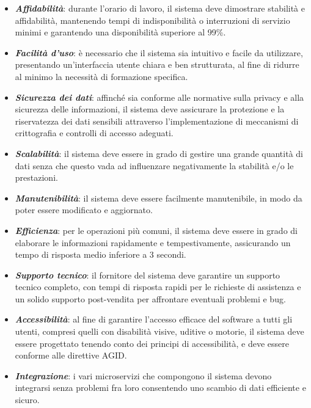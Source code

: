 \documentclass{article}
\begin{document}
  \begin{itemize}
    \item \textbf{\emph{Affidabilità}}: durante l'orario di lavoro, il sistema deve dimostrare 
        stabilità e affidabilità, mantenendo tempi di indisponibilità o 
        interruzioni di servizio minimi e garantendo una disponibilità superiore al 99\%.
    \item \textbf{\emph{Facilità d'uso}}: è necessario che il sistema sia intuitivo e facile 
        da utilizzare, presentando un'interfaccia utente chiara e ben strutturata, 
        al fine di ridurre al minimo la necessità di formazione specifica.
    \item \textbf{\emph{Sicurezza dei dati}}: affinché sia conforme alle normative sulla privacy 
        e alla sicurezza delle informazioni, il sistema deve assicurare la protezione e 
        la riservatezza dei dati sensibili attraverso l'implementazione di meccanismi di 
        crittografia e controlli di accesso adeguati.
    \item \textbf{\emph{Scalabilità}}: il sistema deve essere in grado di gestire una grande quantità
        di dati senza che questo vada ad influenzare negativamente la stabilità e/o le prestazioni.
    \item \textbf{\emph{Manutenibilità}}: il sistema deve essere facilmente manutenibile, 
        in modo da poter essere modificato e aggiornato.
    \item \textbf{\emph{Efficienza}}: per le operazioni più comuni, il sistema deve essere in grado 
        di elaborare le informazioni rapidamente e tempestivamente, assicurando un tempo 
        di risposta medio inferiore a 3 secondi.
    \item \textbf{\emph{Supporto tecnico}}: il fornitore del sistema deve garantire un supporto tecnico 
        completo, con tempi di risposta rapidi per le richieste di assistenza e un solido supporto 
        post-vendita per affrontare eventuali problemi e bug.
    \item \textbf{\emph{Accessibilità}}: al fine di garantire l'accesso efficace del software a tutti
        gli utenti, compresi quelli con disabilità visive, uditive o motorie, il sistema deve essere
        progettato tenendo conto dei principi di accessibilità, e deve essere conforme 
        alle direttive AGID.
    \item \textbf{\emph{Integrazione}}: i vari microservizi che compongono il sistema devono integrarsi
        senza problemi fra loro consentendo uno scambio di dati efficiente e sicuro.
  \end{itemize}

 
\end{document}
